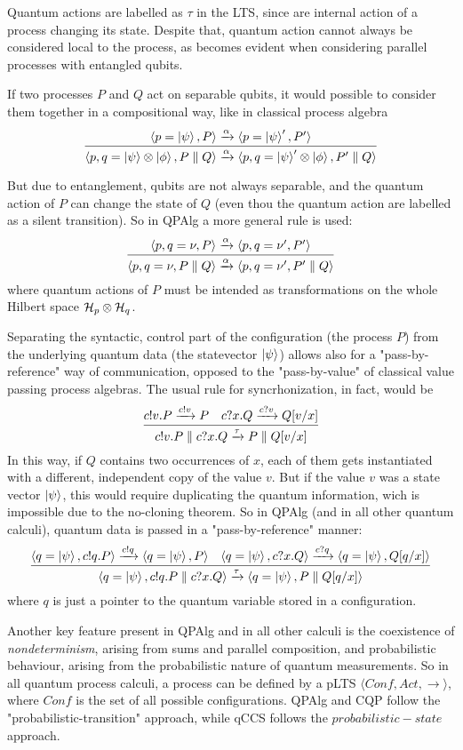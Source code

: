 Quantum actions are labelled as $\tau$ in the LTS, since are internal action of a process changing its state. Despite that, quantum action cannot always be considered local to the process, as becomes evident when considering parallel processes with entangled qubits.

If two processes $P$ and $Q$ act on separable qubits, it would possible to consider them together in a compositional way, like in classical process algebra
\[ \infer{\langle p,q=\kp\otimes\kf, P\parallel Q\rangle \xrightarrow{\alpha} \langle p,q=\kp'\otimes\kf, P'\parallel Q\rangle}{\langle p=\kp, P\rangle \xrightarrow{\alpha} \langle p=\kp', P'\rangle}\]

But due to entanglement, qubits are not always separable, and the quantum action of $P$ can change the state of $Q$ (even thou the quantum action are labelled as a silent transition). So in QPAlg a more general rule is used:
\[\infer{\langle p,q=\nu, P\parallel Q\rangle \xrightarrow{\alpha} \langle p,q=\nu', P'\parallel Q\rangle}{\langle p, q=\nu, P\rangle \xrightarrow{\alpha} \langle p, q=\nu', P'\rangle}\]
where quantum actions of $P$ must be intended as transformations on the whole Hilbert space $\mathcal{H}_p \otimes \mathcal{H}_q$.

Separating the syntactic, control part of the configuration (the process $P$) from the underlying quantum data (the statevector $\ket{\psi}$) allows also for a "pass-by-reference" way of communication, opposed to the "pass-by-value" of classical value passing process algebras.
The usual rule for syncrhonization, in fact, would be
	\[ \infer{c!v.P \parallel c?x.Q \xrightarrow{\tau} P\parallel Q[v/x]}
	{ c!v.P \xrightarrow{c!v} P & c?x.Q \xrightarrow{c?v} Q[v/x]}
	\] 
In this way, if $Q$ contains two occurrences of $x$, each of them gets instantiated with a different, independent copy of the value $v$. But if the value $v$ was a state vector $\ket{\psi}$, this would require duplicating the quantum information, wich is impossible due to the no-cloning theorem.
So in QPAlg (and in all other quantum calculi), quantum data is passed in a "pass-by-reference" manner:
\[ \infer{ \langle q=\kp, c!q.P \parallel c?x.Q \rangle \xrightarrow{\tau}  \langle q=\kp, P\parallel Q[q/x] \rangle}
{  \langle q=\kp, c!q.P \rangle \xrightarrow{c!q}  \langle q=\kp, P \rangle & \langle q=\kp,  c?x.Q \rangle \xrightarrow{c?q} \langle q=\kp,  Q[q/x] \rangle}
\] 
where $q$ is just a pointer to the quantum variable stored in a configuration.



Another key feature present in QPAlg and in all other calculi is the coexistence of \textit{nondeterminism}, arising from sums and parallel composition, and probabilistic behaviour, arising from the probabilistic nature of quantum measurements. 
So in all quantum process calculi, a process can be defined by a pLTS $\langle Conf, Act, \rightarrow \rangle$, where $Conf$ is the set of all possible configurations. 
QPAlg and CQP follow the "probabilistic-transition" approach, while qCCS follows the $probabilistic-state$ approach.



